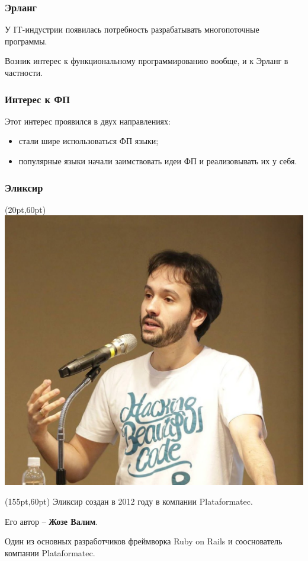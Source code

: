\documentclass[10pt]{beamer}
\begin{document}
\begin{frame}
  \frametitle{Эрланг}
  У IT-индустрии появилась потребность
  разрабатывать многопоточные программы.
  \par \bigskip
  Возник интерес к функциональному программированию вообще,
  и к Эрланг в частности.
\end{frame}

\begin{frame}
  \frametitle{Интерес к ФП}
  Этот интерес проявился в двух направлениях:
  \begin{itemize}
  \item стали шире использоваться ФП языки;
  \item популярные языки начали заимствовать идеи ФП и реализовывать их у себя.
  \end{itemize}
\end{frame}

\begin{frame}
  \frametitle{Эликсир}
  \begin{textblock*}{75pt}(20pt,60pt)
    \includegraphics[scale=0.1]{jose_valim}
  \end{textblock*}
  \begin{textblock*}{220pt}(155pt,60pt)
    Эликсир создан в 2012 году в компании Plataformatec.
    \par \bigskip
    Его автор -- \textbf{Жозе Валим}.
    \par \bigskip
    Один из основных разработчиков фреймворка Ruby on Rails
    и сооснователь компании Plataformatec.
  \end{textblock*}
\end{frame}
\end{document}
